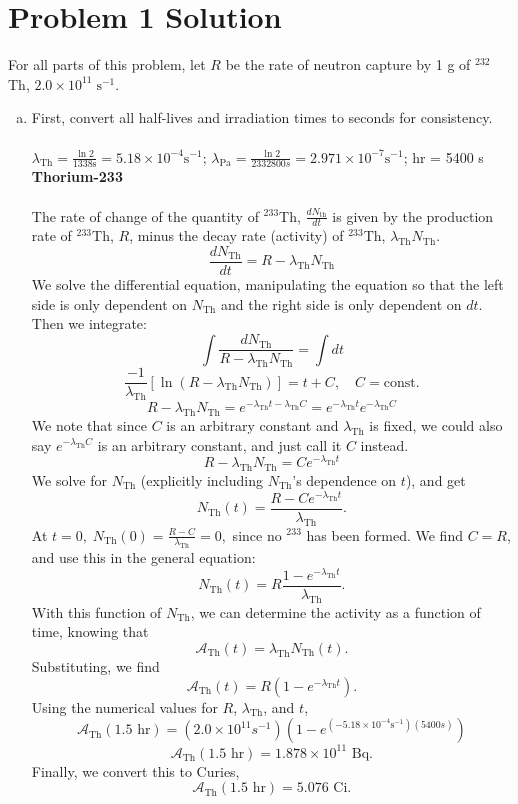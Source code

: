 \documentclass{report}
\begin{document}
\section*{Problem 1 Solution}


For all parts of this problem, let $R$ be the rate of neutron capture by 1 g of $^{232}$Th, $2.0 \times 10^{11} \;\text{s}^{-1}$.\\

\begin{enumerate}[a)]

\item

First, convert all half-lives and irradiation times to seconds for consistency.\\ 
\-\\
\tab $\lambda_{\text{Th}} = \frac{\ln{2}}{1338\text{s}} = 5.18\times10^{-4}\text{s}^{-1}$; \tab $\lambda_{\text{Pa}}=\frac{\ln{2}}{2332800s}=2.971\times10^{-7}\text{s}^{-1}$;  hr = 5400 s\\

\textbf{Thorium-233}\\
\-\\
The rate of change of the quantity of $^{233}$Th, $\frac{dN_{\text{th}}}{dt}$ is given by the production rate of $^{233}$Th, $R$, minus the decay rate (activity) of $^{233}$Th, $\lambda_{\text{Th}}N_{\text{Th}}$.
$$\frac{dN_{\text{Th}}}{dt} = R - \lambda_{\text{Th}}N_{\text{Th}}$$
We solve the differential equation, manipulating the equation so that the left side is only dependent on $N_{\text{Th}}$ and the right side is only dependent on $dt$. Then we integrate:
$$\int{\frac{dN_{\text{Th}}}{R-\lambda_{\text{Th}}N_{\text{Th}}}} = \int{dt}$$
$$\frac{-1}{\lambda_{\text{Th}}}[\ln(R-\lambda_{\text{Th}}N_{\text{Th}})] = t + C,\quad C=\text{const.}$$
$$R-\lambda_{\text{Th}}N_{\text{Th}} = e^{-\lambda_{\text{Th}}t -\lambda_{\text{Th}}C} = e^{-\lambda_{\text{Th}}t} e^{-\lambda_{\text{Th}}C}$$
We note that since $C$ is an arbitrary constant and $\lambda_{\text{Th}}$ is fixed, we could also say $e^{-\lambda_{\text{Th}}C}$ is an arbitrary constant, and just call it $C$ instead.
$$ R-\lambda_{\text{Th}}N_{\text{Th}} = Ce^{-\lambda_{\text{Th}}t} $$
We solve for $N_{\text{Th}}$ (explicitly including $N_{\text{Th}}$'s dependence on $t$), and get
$$ N_{\text{Th}}(t) = \frac{R - Ce^{-\lambda_{\text{Th}}t}}{\lambda_{\text{Th}}} .$$
At $t=0,\; N_{\text{Th}}(0) = \frac{R - C}{\lambda_{\text{Th}}}=0,$ since no $^{233}$ has been formed. We find $C= R$, and use this in the general equation:
$$ N_{\text{Th}}(t) = R\frac{1 - e^{-\lambda_{\text{Th}}t}}{\lambda_{\text{Th}}}. $$
With this function of $N_{\text{Th}}$, we can determine the activity as a function of time, knowing that
$$ \mathcal{A}_{\text{Th}}(t) = \lambda_{\text{Th}}N_{\text{Th}}(t). $$
Substituting, we find
$$ \mathcal{A}_{\text{Th}}(t) = R(1-e^{-\lambda_{\text{Th}}t}) .$$
Using the numerical values for $R$, $\lambda_{\text{Th}}$, and $t$,
$$ \mathcal{A}_{\text{Th}}(1.5\text{ hr}) =(2.0\times10^{11}s^{-1})(1-e^{(-5.18\times10^{-4}\text{s}^{-1})(5400s)}) $$
$$ \mathcal{A}_{\text{Th}}(1.5\text{ hr}) = 1.878\times10^{11}\text{ Bq} .$$
Finally, we convert this to Curies,
$$\boxed{ \mathcal{A}_{\text{Th}}(1.5\text{ hr}) = 5.076\text{ Ci} }.$$


\end{enumerate}
\end{document}
